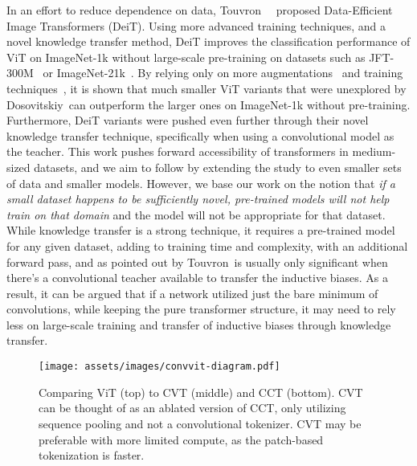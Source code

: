 \documentclass[10pt,twocolumn,letterpaper]{article}
\begin{document}
In an effort to reduce dependence on data, Touvron~\etal~\cite{touvron2020training} proposed Data-Efficient Image Transformers (DeiT). Using more advanced training techniques, and a novel knowledge transfer method, DeiT improves the classification performance of ViT on ImageNet-1k without large-scale pre-training on datasets such as JFT-300M~\cite{sun2017revisiting} or ImageNet-21k~\cite{deng2009imagenet}. By relying only on more augmentations~\cite{cubuk2020randaugment} and training techniques~\cite{zhang2017mixup,yun2019cutmix}, it is shown that much smaller ViT variants that were unexplored by Dosovitskiy~\etal can outperform the larger ones on ImageNet-1k without pre-training. Furthermore, DeiT variants were pushed even further through their novel knowledge transfer technique, specifically when using a convolutional model as the teacher.
This work pushes forward accessibility of transformers in medium-sized datasets, and we aim to follow by extending the study to even smaller sets of data and smaller models.
However, we base our work on the notion that \textit{if a small dataset happens to be sufficiently novel, pre-trained models will not help train on that domain} and the model will not be appropriate for that dataset.
While knowledge transfer is a strong technique, it requires a pre-trained model for any given dataset, adding to training time and complexity, with an additional forward pass, and as pointed out by Touvron~\etal is usually only significant when there's a convolutional teacher available to transfer the inductive biases. As a result, it can be argued that if a network utilized just the bare minimum of convolutions, while keeping the pure transformer structure, it may need to rely less on large-scale training and transfer of inductive biases through knowledge transfer.

\begin{figure*}[ht!]
    \centering
    \texttt{[image: assets/images/convvit-diagram.pdf]}
    \caption{Comparing ViT (top) to CVT (middle) and CCT (bottom). CVT can be thought of as an ablated version of CCT, only utilizing sequence pooling and not a convolutional tokenizer. CVT may be preferable with more limited compute, as the patch-based tokenization is faster.}
    \label{fig:vit_comparison}
\end{figure*}
\end{document}
